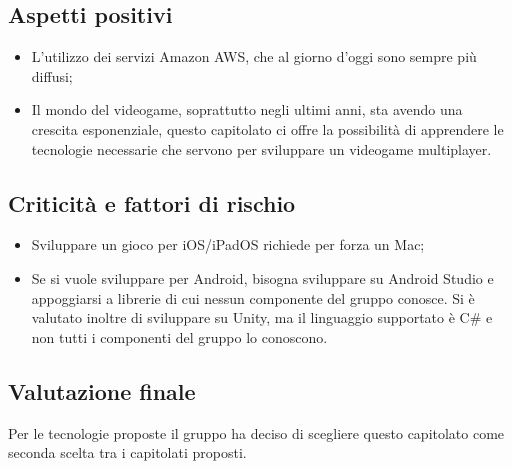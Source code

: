 \subsection{Aspetti positivi}
\begin{itemize}
\item L'utilizzo dei servizi Amazon AWS, che al giorno d'oggi sono sempre più diffusi;
\item Il mondo del videogame, soprattutto negli ultimi anni, sta avendo una crescita esponenziale, questo capitolato ci offre la possibilità di apprendere le tecnologie necessarie che servono per sviluppare un videogame multiplayer.
\end{itemize}

\subsection{Criticità e fattori di rischio}
\begin{itemize}
\item Sviluppare un gioco per iOS/iPadOS richiede per forza un Mac;
\item Se si vuole sviluppare per Android, bisogna sviluppare su Android Studio e appoggiarsi a librerie di cui nessun componente del gruppo conosce. 
Si è valutato inoltre di sviluppare su Unity, ma il linguaggio supportato è C\# e non tutti i componenti del gruppo lo conoscono.
\end{itemize}

\subsection{Valutazione finale}
Per le tecnologie proposte il gruppo \Gruppo{} ha deciso di scegliere questo capitolato come seconda scelta tra i capitolati proposti.